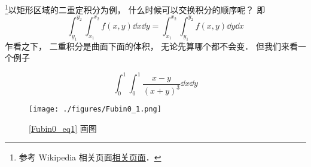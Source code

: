 
\footnote{参考 Wikipedia 相关页面\href{https://en.wikipedia.org/wiki/Fubini's_theorem}{相关页面}．}以矩形区域的二重定积分为例， 什么时候可以交换积分的顺序呢？ 即
\begin{equation}
\int_{y_1}^{y_2}\int_{x_1}^{x_2} f(x, y) \dd{x} \dd{y} = \int_{x_1}^{x_2}\int_{y_1}^{y_2} f(x, y) \dd{y}\dd{x}
\end{equation}
乍看之下， 二重积分是曲面下面的体积， 无论先算哪个都不会变． 但我们来看一个例子

\begin{example}{}
\begin{equation}\label{Fubin0_eq1}
\int_0^1 \int_0^1 \frac{x - y}{(x+y)^3} \dd{x} \dd{y}
\end{equation}
\begin{figure}[ht]
\centering
\texttt{[image: ./figures/Fubin0\_1.png]}
\caption{\autoref{Fubin0_eq1} 画图} \label{Fubin0_fig1}
\end{figure}
\end{example}
